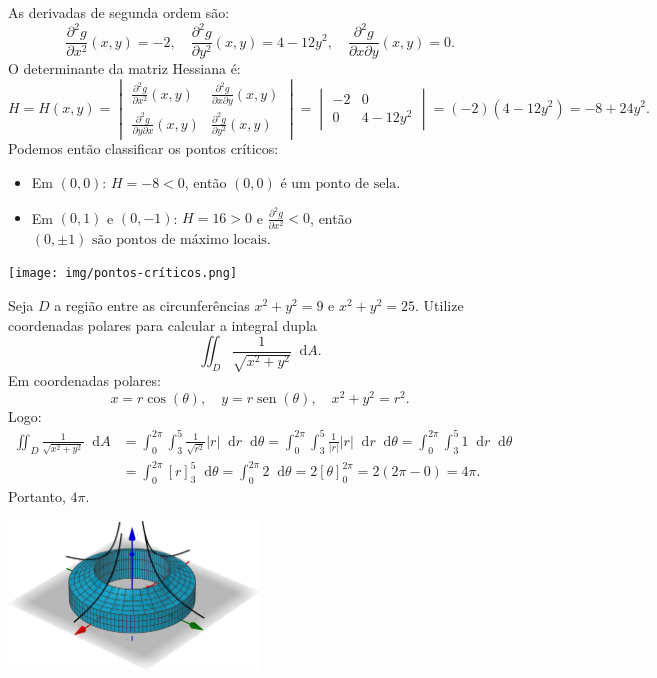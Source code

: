 \documentclass[12pt,a4paper]{article}
\newcommand*\diff{\mathop{}\!\mathrm{d}}
\newcommand*\sen{\operatorname{sen}}
\begin{document}
\begin{ExerciseList}
As derivadas de segunda ordem são:
\[
\frac{\partial^2 g}{\partial x^2}(x, y) = -2,
\quad
\frac{\partial^2 g}{\partial y^2}(x, y) = 4 - 12y^2,
\quad
\frac{\partial^2 g}{\partial x \partial y}(x, y) = 0.
\]
O determinante da matriz Hessiana é:
\[
H
= H(x, y)
= \begin{vmatrix}
    \frac{\partial^2 g}{\partial x^2}(x, y) & \frac{\partial^2 g}{\partial x \partial y}(x, y) \\
    \frac{\partial^2 g}{\partial y \partial x}(x, y) & \frac{\partial^2 g}{\partial y^2}(x, y)
\end{vmatrix}
= \begin{vmatrix}
    -2 & 0 \\
    0 & 4 - 12y^2
\end{vmatrix}
= (-2)(4 - 12y^2)
= -8 + 24y^2.
\]
Podemos então classificar os pontos críticos:
\begin{itemize}
    \item Em \((0, 0)\): \(H = -8 < 0\), então \(\boxed{(0, 0) \text{ é um ponto de sela}}\).
    \item Em \((0, 1)\) e \((0, -1)\): \(H = 16 > 0\) e \(\frac{\partial^2 g}{\partial x^2} < 0\), então \(\boxed{(0, \pm 1) \text{ são pontos de máximo locais}}\).
\end{itemize}

\begin{center}
\texttt{[image: img/pontos-críticos.png]}
\end{center}


\Exercise[title={2,5}]
Seja \(D\) a região entre as circunferências \(x^2 + y^2 = 9\) e \(x^2 + y^2 = 25\). Utilize coordenadas polares para calcular a integral dupla
\[
\iint_{D} \frac{1}{\sqrt{x^2 + y^2}} \diff{A}.
\]
\Answer Em coordenadas polares:
\[
x = r\cos(\theta), \quad y = r\sen(\theta), \quad x^2 + y^2 = r^2.
\]
Logo:
\begin{align*}
    \iint_{D} \frac{1}{\sqrt{x^2 + y^2}} \diff{A}
    & = \int_{0}^{2\pi} \int_{3}^{5} \frac{1}{\sqrt{r^2}} |r| \diff{r} \diff{\theta}
    = \int_{0}^{2\pi} \int_{3}^{5} \frac{1}{|r|} |r|\diff{r} \diff{\theta}
    = \int_{0}^{2\pi} \int_{3}^{5} 1\diff{r} \diff{\theta} \\
    & = \int_{0}^{2\pi} [r]_{3}^{5} \diff{\theta}
    = \int_{0}^{2\pi} 2 \diff{\theta}
    = 2[\theta]_{0}^{2\pi}
    = 2(2\pi - 0)
    = 4\pi.
\end{align*}
Portanto, \(\boxed{4\pi}\).

\begin{center}
\includegraphics[width=0.5\textwidth]{img/integral-dupla.png}
\end{center}



\end{ExerciseList}
\end{document}

